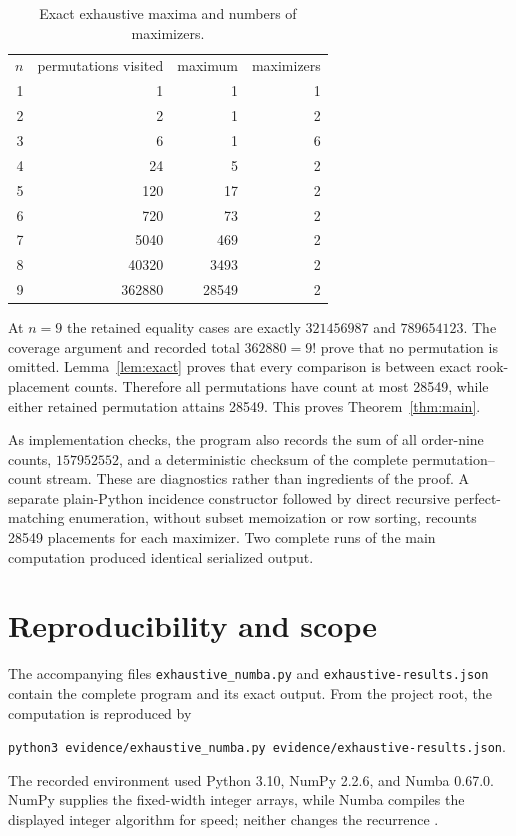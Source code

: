 \documentclass[11pt]{article}
\begin{document}
\begin{table}[ht]
  \centering
  \caption{Exact exhaustive maxima and numbers of maximizers.}
  \label{tab:all}
  \begin{tabular}{@{}rrrr@{}}
    $n$ & permutations visited & maximum & maximizers \\
    1 & 1      & 1     & 1 \\
    2 & 2      & 1     & 2 \\
    3 & 6      & 1     & 6 \\
    4 & 24     & 5     & 2 \\
    5 & 120    & 17    & 2 \\
    6 & 720    & 73    & 2 \\
    7 & 5040   & 469   & 2 \\
    8 & 40320  & 3493  & 2 \\
    9 & 362880 & 28549 & 2 \\
  \end{tabular}
\end{table}

At $n=9$ the retained equality cases are exactly $321456987$ and
$789654123$.  The coverage argument and recorded total $362880=9!$ prove
that no permutation is omitted.  Lemma~\ref{lem:exact} proves that every
comparison is between exact rook-placement counts.  Therefore all
permutations have count at most 28549, while either retained permutation
attains 28549.  This proves Theorem~\ref{thm:main}.

As implementation checks, the program also records the sum of all order-nine
counts, $157952552$, and a deterministic checksum of the complete
permutation--count stream.  These are diagnostics rather than ingredients of
the proof.  A separate plain-Python incidence constructor followed by direct
recursive perfect-matching enumeration, without subset memoization or row
sorting, recounts 28549 placements for each maximizer.  Two complete runs of
the main computation produced identical serialized output.

\section{Reproducibility and scope}

The accompanying files \texttt{exhaustive\_numba.py} and
\texttt{exhaustive-results.json} contain the complete program and its exact
output.  From the project root, the computation is reproduced by
\begin{center}
\texttt{python3 evidence/exhaustive\_numba.py evidence/exhaustive-results.json}.
\end{center}
The recorded environment used Python 3.10, NumPy 2.2.6, and Numba 0.67.0.
NumPy supplies the fixed-width integer arrays, while Numba compiles the
displayed integer algorithm for speed; neither changes the recurrence
\cite{HarrisEtAl2020,LamPitrouSeibert2015}.
\end{document}
